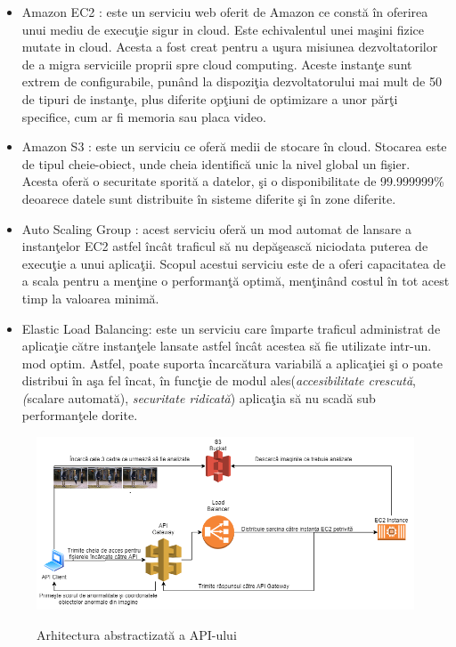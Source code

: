 \documentclass[a4paper,12pt]{report}
\begin{document}
\begin{itemize}
\item Amazon EC2 : este un serviciu web oferit de Amazon ce constă în oferirea unui mediu de execuţie sigur in cloud. Este echivalentul unei maşini fizice mutate in cloud. Acesta a fost creat pentru a uşura misiunea dezvoltatorilor de a migra serviciile proprii spre cloud computing.  Aceste instanţe sunt extrem de configurabile, punând la dispoziţia dezvoltatorului mai mult de 50 de tipuri de instanţe, plus diferite opţiuni de optimizare a unor părţi specifice, cum ar fi memoria sau placa video. \cite{2020EC2}
\item Amazon S3 : este un serviciu ce oferă medii de stocare în cloud. Stocarea este de tipul cheie-obiect, unde cheia identifică unic la nivel global un fişier. Acesta oferă o securitate sporită a datelor, şi o disponibilitate de 99.999999\% deoarece datele sunt distribuite în sisteme diferite şi în zone diferite.
\cite{2020S3}
\item Auto Scaling Group : acest serviciu oferă un mod automat de lansare a instanţelor EC2 astfel încât traficul să nu depăşească niciodata puterea de execuţie a unui aplicaţii. Scopul acestui serviciu este de a oferi capacitatea de a scala pentru a menţine o performanţă optimă, menţinând costul în tot acest timp la valoarea minimă.
\cite{2020autoscaling}
\item Elastic Load Balancing: este un serviciu care împarte traficul administrat de aplicaţie către instanţele lansate astfel încât acestea să fie utilizate intr-un. mod optim. Astfel, poate suporta încarcătura variabilă a aplicaţiei şi o poate distribui în aşa fel încat, în funcţie de modul ales(\emph {accesibilitate crescută}, \emph(scalare automată), \emph{securitate ridicată}) aplicaţia să nu scadă sub performanţele dorite.
\cite{2020elb}
\end{itemize}
\par 
\begin{figure}
\begin{center}
        \includegraphics[width=1\textwidth]{images/client_drawing}
			 \label{fig:client_design}
			 \caption{Arhitectura abstractizată a API-ului}
\end{center}
\end{figure}
\end{document}
